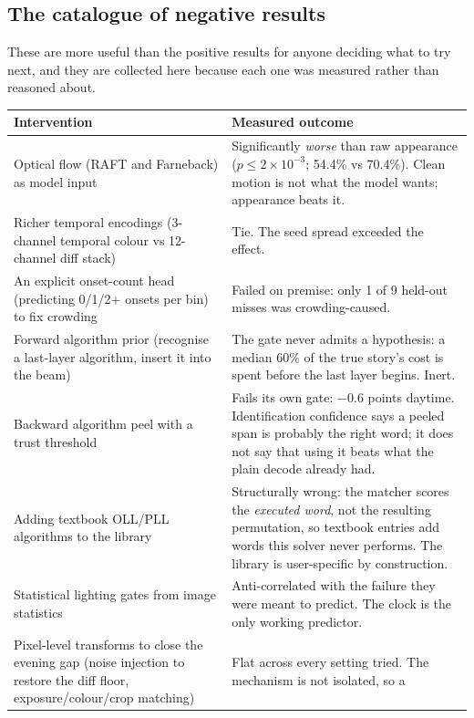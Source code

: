 \subsection{The catalogue of negative results}
\label{sec:negatives}

These are more useful than the positive results for anyone deciding what to
try next, and they are collected here because each one was measured rather
than reasoned about.

\begin{center}\small
\begin{tabular}{@{}p{5.4cm}p{9.6cm}@{}}
\toprule
\textbf{Intervention} & \textbf{Measured outcome} \\
\midrule
Optical flow (RAFT and Farneback) as model input
  & Significantly \emph{worse} than raw appearance ($p \le 2\times10^{-3}$;
    54.4\% vs 70.4\%). Clean motion is not what the model wants; appearance
    beats it. \\
Richer temporal encodings (3-channel temporal colour vs 12-channel diff
stack)
  & Tie. The seed spread exceeded the effect. \\
An explicit onset-count head (predicting 0/1/2+ onsets per bin) to fix
crowding
  & Failed on premise: only 1 of 9 held-out misses was crowding-caused. \\
Forward algorithm prior (recognise a last-layer algorithm, insert it into
the beam)
  & The gate never admits a hypothesis: a median 60\% of the true story's
    cost is spent before the last layer begins. Inert. \\
Backward algorithm peel with a trust threshold
  & Fails its own gate: $-0.6$ points daytime. Identification confidence says
    a peeled span is probably the right word; it does not say that using it
    beats what the plain decode already had. \\
Adding textbook OLL/PLL algorithms to the library
  & Structurally wrong: the matcher scores the \emph{executed word}, not the
    resulting permutation, so textbook entries add words this solver never
    performs. The library is user-specific by construction. \\
Statistical lighting gates from image statistics
  & Anti-correlated with the failure they were meant to predict. The clock is
    the only working predictor. \\
Pixel-level transforms to close the evening gap (noise injection to restore
the diff floor, exposure/colour/crop matching)
  & Flat across every setting tried. The mechanism is not isolated, so a

\end{tabular}
\end{center}
